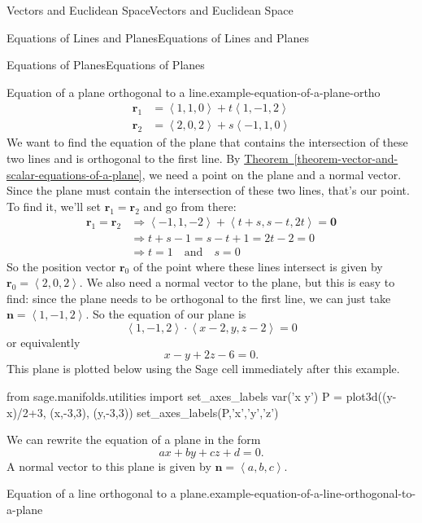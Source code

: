 \documentclass[10pt,]{book}
\numberwithin{equation}{section}
\newcommand{\vv}[1]{\mathbf{#1}}
\newcommand{\dotprod}[1]{\left\langle #1 \right\rangle}
\begin{document}
\begin{chapterptx}{Vectors and Euclidean Space}{}{Vectors and Euclidean Space}{}{}
\begin{sectionptx}{Equations of Lines and Planes}{}{Equations of Lines and Planes}{}{}
\begin{subsectionptx}{Equations of Planes}{}{Equations of Planes}{}{}
\begin{example}{Equation of a plane orthogonal to a line.}{example-equation-of-a-plane-ortho}
\begin{align*}
\vv{r}_{1} & = \dotprod{1,1,0} + t\dotprod{1,-1,2} \\
\vv{r}_{2} & = \dotprod{2,0,2} + s\dotprod{-1,1,0} 
\end{align*}
\hypertarget{p-1005}{}%
We want to find the equation of the plane that contains the intersection of these two lines and is orthogonal to the first line. By \hyperref[theorem-vector-and-scalar-equations-of-a-plane]{Theorem~\ref{theorem-vector-and-scalar-equations-of-a-plane}}, we need a point on the plane and a normal vector. Since the plane must contain the intersection of these two lines, that's our point. To find it, we'll set \(\vv{r}_{1} = \vv{r}_{2}\) and go from there:%
%
\begin{align*}
\vv{r}_{1}=\vv{r}_{2} & \Rightarrow \dotprod{-1,1,-2} + \dotprod{t+s,s-t,2t} = \vv{0} \\
& \Rightarrow t+s-1 = s-t+1 = 2t-2 = 0 \\
& \Rightarrow t = 1\quad\text{and}\quad s=0 
\end{align*}
\hypertarget{p-1006}{}%
So the position vector \(\vv{r}_{0}\) of the point where these lines intersect is given by \(\vv{r}_{0} = \dotprod{2,0,2}\). We also need a normal vector to the plane, but this is easy to find: since the plane needs to be orthogonal to the first line, we can just take \(\vv{n} = \dotprod{1,-1,2}\). So the equation of our plane is%
%
\begin{equation*}
\dotprod{1,-1,2}\cdot\dotprod{x-2,y,z-2} = 0
\end{equation*}
\hypertarget{p-1007}{}%
or equivalently%
%
\begin{equation*}
x-y+2z -6 = 0.
\end{equation*}
\hypertarget{p-1008}{}%
This plane is plotted below using the Sage cell immediately after this example.%
\end{example}
\begin{sageinput}
from sage.manifolds.utilities import set_axes_labels
var('x y')
P = plot3d((y-x)/2+3, (x,-3,3), (y,-3,3)) 
set_axes_labels(P,'x','y','z')
\end{sageinput}
\hypertarget{p-1009}{}%
We can rewrite the equation of a plane in the form%
%
\begin{equation*}
ax+by+cz+d = 0.
\end{equation*}
\hypertarget{p-1010}{}%
A normal vector to this plane is given by \(\vv{n} = \dotprod{a,b,c}\).%
\begin{example}{Equation of a line orthogonal to a plane.}{example-equation-of-a-line-orthogonal-to-a-plane}%

\end{example}
\end{subsectionptx}
\end{sectionptx}
\end{chapterptx}
\end{document}
